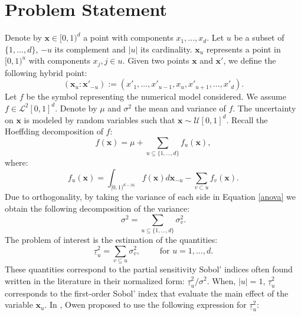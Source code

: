 \documentclass[]{elsarticle}
\theoremstyle{definition}
\newcommand{\bvec}[1]{\boldsymbol{#1}}
\newcommand{\vx}{\bvec{x}}
\begin{document}
\begin{frontmatter}

\title{}

\author{Cl\'ementine Prieur, Elise Arnaud, Herv\'{e} Monod, Laurent Gilquin, Fred J. Hickernell, Llu\'{i}s Antoni Jim\'{e}nez Rugama}
\address{U. Josef Fourier, Illinois Institute of Technology}
\begin{abstract}
\end{abstract}

\end{frontmatter}

\section{Problem Statement}
Denote by $\vx \in [0,1)^d$ a point with components $x_1,\dots,x_d$. Let $u$ be a subset of $\{1,\dots,d\}$, $-u$ its complement and $|u|$ its cardinality. $\vx_u$ represents a point in $[0,1)^u$ with components $x_j, j \in u$. Given two points $\vx$ and $\vx'$, we define the following hybrid point: 
\[(\vx_u:{\vx'}_{-u}) := ({x'}_1,\dots,{x'}_{u-1},x_u,{x'}_{u+1},\dots,{x'}_d).\]
Let $f$ be the symbol representing the numerical model considered. We assume $f \in \mathcal{L}^2[0,1]^d$. Denote by $\mu$ and $\sigma^2$ the mean and variance of $f$.
The uncertainty on $\vx$ is modeled by random variables such that $\vx \sim \mathcal{U}[0,1]^d$. Recall the Hoeffding decomposition of $f$:
\begin{equation}
f(\vx)=\mu+\sum \limits_{u \subseteq \{1,\dots,d\}} f_u(\vx),
\label{anova}
\end{equation}
where:
\[f_u(\vx)= \int_{[0,1)^{d-|u|}} f(\vx) d{\vx}_{-u} - \sum \limits_{v \subset u} f_v(\vx).\]
Due to orthogonality, by taking the variance of each side in Equation \ref{anova} we obtain the following decomposition of the variance:
\[ \sigma^2 = \sum \limits_{u \subseteq \{1,\dots,d\}} \sigma_v^2.\]
The problem of interest is the estimation of the quantities:
\[\underline{\tau}_u^2 = \sum \limits_{v \subseteq u} \sigma_v^2, \qquad \text{ for } u = 1,\dots,d.\]
These quantities correspond to the partial sensitivity Sobol' indices often found written in the literature in their normalized form: $\underline{\tau}_u^2/\sigma^2$. When, $|u|=1$, $\underline{\tau}_u^2$ corresponds to the first-order Sobol' index that evaluate the main effect of the variable $\vx_u$. In \cite{}, Owen proposed to use the following expression for $\underline{\tau}_u^2$:
\end{document}
